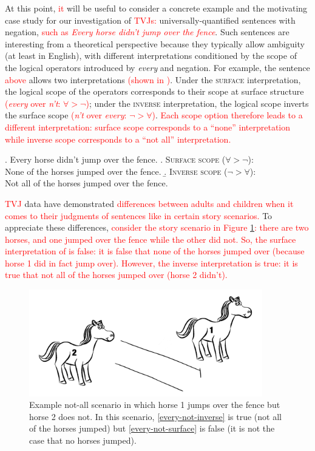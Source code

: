 \documentclass[preprint,authoryear]{elsarticle}\frenchspacing
\newcommand{\lp}[1]{\textcolor{red}{#1}} %
\begin{document}
At this point, \lp{it} will be useful to consider a concrete example and the motivating case study for our investigation of 
\lp{TVJs:}
universally-quantified sentences with negation, 
\lp{such as \textit{Every horse didn't jump over the fence}}. Such sentences are interesting from a theoretical perspective because they typically allow ambiguity (at least in English), with different interpretations conditioned by the scope of the logical operators introduced by \emph{every} and negation. For example, the sentence
\lp{above}
 allows two interpretations 
 \lp{(shown in \Next)}. Under the \textsc{surface} interpretation, the logical scope of the operators corresponds to their scope at surface structure \lp{(\textit{every} over \textit{n't}: $\forall > \neg$)}; under the \textsc{inverse} interpretation, the logical scope inverts the surface scope
 \lp{(\textit{n't} over \textit{every}: $\neg > \forall$)}.
 \lp{Each scope option therefore leads to a different interpretation: 
 surface scope corresponds to a ``none'' interpretation while 
 inverse scope corresponds to a ``not all'' interpretation.}

\ex. \label{every-not}
Every horse didn't jump over the fence.
\a. \label{every-not-surface}
\textsc{Surface scope} ($\forall > \neg$):\\
None of the horses jumped over the fence.
\b. \label{every-not-inverse}
\textsc{Inverse scope} ($\neg > \forall$):\\
Not all of the horses jumped over the fence. 


\lp{TVJ}
data have demonstrated 
\lp{differences between adults and children when it comes to
their judgments of sentences like \Last in certain story scenarios.}
To appreciate these differences, \lp{consider the story scenario in Figure \ref{not-all}: there are two horses, and one jumped over the fence while the other did not. So, the surface interpretation of \Last is false: it is false that none of the horses jumped over (because horse 1 did in fact jump over).
However, the inverse interpretation is true: it is true that not all of the horses jumped over (horse 2 didn't).}

\begin{figure}
    \centering
    \includegraphics[width=4in]{not-all.png}
    \caption{Example not-all scenario in which horse 1 jumps over the fence but horse 2 does not. In this scenario, \ref{every-not-inverse} is true (not all of the horses jumped) but \ref{every-not-surface} is false (it is not the case that no horses jumped).}
    \label{not-all}
\end{figure}
\end{document}
